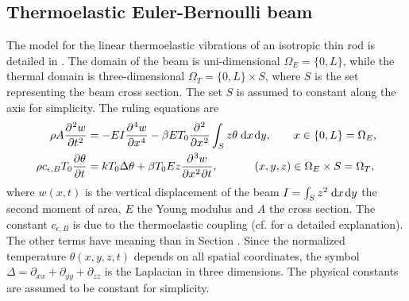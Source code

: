 \subsection{Thermoelastic Euler-Bernoulli beam}
The model for the linear thermoelastic vibrations of an isotropic thin rod is detailed in  \cite{chadwick1962propagation,lifshitz2000thermoelastic}. The domain of the beam is uni-dimensional $\Omega_E = \{0, L\}$, while the thermal domain is three-dimensional $\Omega_T = \{0, L\} \times S$, where $S$ is the set representing the beam cross section. The set $S$ is assumed to constant along the axis for simplicity. The ruling equations are  
\begin{equation}\label{eq:heatbeam}
\begin{aligned}
\rho A \diffp[2]{w}{t} &= - EI \diffp[4]{w}{x} - \beta E T_0 \diffp[2]{}{x} \int_{S} z \theta \d{x}\d{y}, \qquad x \in \{0, L\}=\Omega_E, \\
\rho c_{\epsilon, B} T_0 \diffp{\theta}{t} &= k T_0 \Delta \theta + \beta T_0 E z \diffp[2,1]{w}{x,t}, \qquad \quad\;  (x, y, z) \in \Omega_E \times S = \Omega_T,
\end{aligned} 
\end{equation}
where $w(x,t)$ is the vertical displacement of the beam $I = \int_S z^2 \d{x}\d{y}$ the second moment of area, $E$ the Young modulus and $A$ the cross section. The constant $c_{\epsilon, B}$ is due to the thermoelastic coupling (cf. \cite{chadwick1962propagation,lifshitz2000thermoelastic} for a detailed explanation).  The other terms have meaning than in Section . Since the normalized temperature $\theta(x,y,z,t)$ depends on all spatial coordinates, the symbol $\Delta = \partial_{xx} + \partial_{yy} + \partial_{zz}$ is the Laplacian in three dimensions. The physical constants are assumed to be constant for simplicity.

